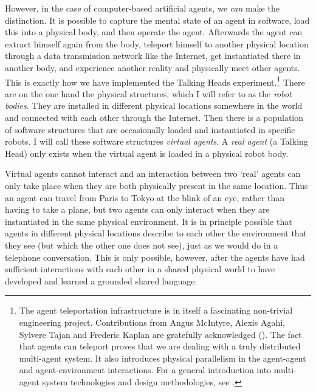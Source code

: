 However, in the case of computer-based 
artificial agents, we {\itshape can} 
make the distinction. It is possible to capture the mental state
of an agent in software, load this into a physical 
body, and then operate 
the agent. Afterwards the agent can extract himself
again from the body, teleport himself 
to another physical location through a data transmission network
like the Internet, get instantiated there in another
body, and experience another reality and physically meet
other agents. This is exactly how we have implemented the 
Talking Heads experiment.\footnote{
The agent teleportation infrastructure is in itself a 
fascinating non-trivial engineering project. Contributions 
from Angus McIntyre, Alexis Agahi, Sylvere Tajan and
Frederic Kaplan are gratefully acknowledged (\cite{McIntyre:1999}). 
The fact that agents can teleport proves that we are dealing 
with a truly distributed multi-agent system. It also 
introduces physical parallelism in the agent-agent and 
agent-environment interactions. 
For a general introduction into multi-agent system
technologies and design methodologies, 
see \cite{Ferber:1999}.}
There are on the one hand
the physical structures, which I will refer to as the {\it
robot bodies}. They are installed in different physical 
locations somewhere in the world and connected
with each other through the Internet. Then there is 
a population of software structures that 
are occasionally loaded and instantiated in specific
robots. I will call these software structures
{\itshape virtual agents}. 
A {\itshape real agent} (a Talking Head) 
only exists when the virtual agent is
loaded in a physical robot body. 

Virtual agents cannot interact and 
an interaction between two `real' agents
can only take place when they are both physically present
in the same location. Thus an agent can travel from
Paris to Tokyo at the blink of an eye, rather than having
to take a plane, but two agents can only interact when they
are instantiated in the same physical environment. 
It is in principle possible that agents in different 
physical locations describe to each other the environment that they 
see (but which the other one does not see), just as we 
would do in a telephone conversation. This is only possible,
however, after the agents have had sufficient interactions
with each other in a shared physical world to have 
developed and learned a grounded shared language. 

